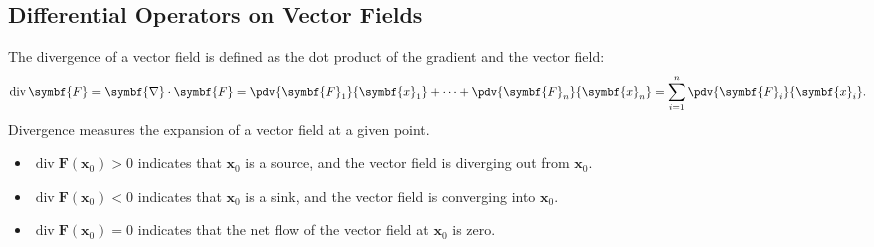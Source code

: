 \documentclass{article}
\DeclareMathOperator{\divergence}{div}
\begin{document}
\subsection{Differential Operators on Vector Fields}
\begin{definition}[Divergence]
    The divergence of a vector field is defined as the dot product of
    the gradient and the vector field:
    \begin{equation*}
        \divergence{\symbf{F}} = \symbf{\nabla} \cdot \symbf{F} = \pdv{\symbf{F}_1}{\symbf{x}_1} + \cdots + \pdv{\symbf{F}_n}{\symbf{x}_n} = \sum_{i = 1}^n \pdv{\symbf{F}_i}{\symbf{x}_i}.
    \end{equation*}
    Divergence measures the expansion of a vector field at a given point.
\end{definition}
\begin{itemize}
    \item \(\divergence{\symbf{F}}\left( \symbf{x}_0 \right) > 0\)
          indicates that \(\symbf{x}_0\) is a source, and the vector field is
          diverging out from \(\symbf{x}_0\).
    \item \(\divergence{\symbf{F}}\left( \symbf{x}_0 \right) < 0\)
          indicates that \(\symbf{x}_0\) is a sink, and the vector field is
          converging into \(\symbf{x}_0\).
    \item \(\divergence{\symbf{F}}\left( \symbf{x}_0 \right) = 0\)
          indicates that the net flow of the vector field at \(\symbf{x}_0\) is zero.
\end{itemize}
\end{document}
